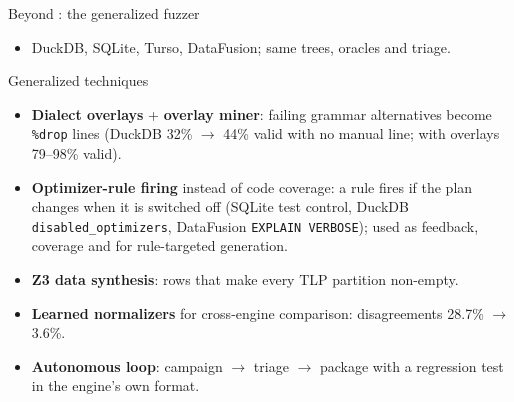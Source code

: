 \documentclass[aspectratio=169,10pt]{beamer}
\begin{document}
\begin{frame}{Beyond \pg: the generalized fuzzer}
\centering\resizebox{!}{0.6\textheight}{}
\small
\begin{itemize}
  \item DuckDB, SQLite, Turso, DataFusion; same trees, oracles and triage.
\end{itemize}
\end{frame}

\begin{frame}{Generalized techniques}
\small
\begin{itemize}
  \item \textbf{Dialect overlays} + \textbf{overlay miner}: failing grammar alternatives become \texttt{\%drop} lines (DuckDB 32\% $\rightarrow$ 44\% valid with no manual line; with overlays 79--98\% valid).
  \item \textbf{Optimizer-rule firing} instead of code coverage: a rule fires if the plan changes when it is switched off (SQLite test control, DuckDB \texttt{disabled\_optimizers}, DataFusion \texttt{EXPLAIN VERBOSE}); used as feedback, coverage and for \alert{rule-targeted generation}.
  \item \textbf{Z3 data synthesis}: rows that make every TLP partition non-empty.
  \item \textbf{Learned normalizers} for cross-engine comparison: disagreements 28.7\% $\rightarrow$ 3.6\%.
  \item \textbf{Autonomous loop}: campaign $\rightarrow$ triage $\rightarrow$ package with a regression test in the engine's own format.
\end{itemize}
\end{frame}
\end{document}
